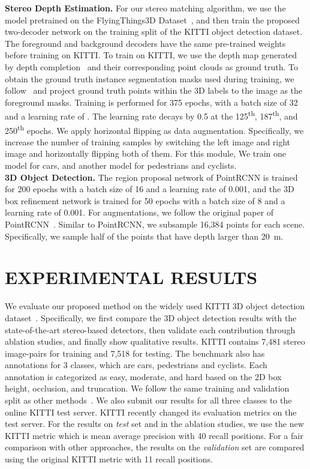 \documentclass[letterpaper, 10 pt, conference]{ieeeconf}
\begin{document}
\noindent \textbf{Stereo Depth Estimation.} For our stereo matching algorithm, we use the model pretrained on the FlyingThings3D Dataset~\cite{mayer2016large}, and then train the proposed two-decoder network on the training split of the KITTI object detection dataset. The foreground and background decoders have the same pre-trained weights before training on KITTI. To train on KITTI, we use the depth map generated by depth completion~\cite{ku2018defense} and their corresponding point clouds as ground truth. To obtain the ground truth instance segmentation masks used during training, we follow~\cite{ku2019monocular} and project ground truth points within the 3D labels to the image as the foreground masks. Training is performed for 375 epochs, with a batch size of 32 and a learning rate of . The learning rate decays by 0.5 at the 125\textsuperscript{th}, 187\textsuperscript{th}, and 250\textsuperscript{th} epochs. We apply horizontal flipping as data augmentation. Specifically, we increase the number of training samples by switching the left image and right image and horizontally flipping both of them. For this module, We train one model for cars, and another model for pedestrians and cyclists. \\

\noindent \textbf{3D Object Detection.}
The region proposal network of PointRCNN is trained for 200 epochs with a batch size of 16 and a learning rate of 0.001, and the 3D box refinement network is trained for 50 epochs with a batch size of 8 and a learning rate of 0.001. For augmentations, we follow the original paper of PointRCNN~\cite{shi2019pointrcnn}. Similar to PointRCNN, we subsample 16,384 points for each scene. Specifically, we sample half of the points that have depth larger than 20~m.

\section{EXPERIMENTAL RESULTS}\label{results}
We evaluate our proposed method on the widely used KITTI 3D object detection dataset~\cite{geiger2012we}. Specifically, we first compare the 3D object detection results with the state-of-the-art stereo-based detectors, then validate each contribution through ablation studies, and finally show qualitative results. KITTI contains 7,481 stereo image-pairs for training and 7,518 for testing. The benchmark also has annotations for 3 classes, which are cars, pedestrians and cyclists. Each annotation is categorized as easy, moderate, and hard based on the 2D box height, occlusion, and truncation. We follow the same training and validation split as other methods~\cite{wang2019pseudo, pon2019object, li2019stereo}. We also submit our results for all three classes to the online KITTI test server. KITTI recently changed its evaluation metrics on the test server. For the results on \emph{test} set and in the ablation studies, we use the new KITTI metric which is mean average precision with 40 recall positions. For a fair comparison with other approaches, the results on the \emph{validation} set are compared using the original KITTI metric with 11 recall positions.\\
\end{document}

